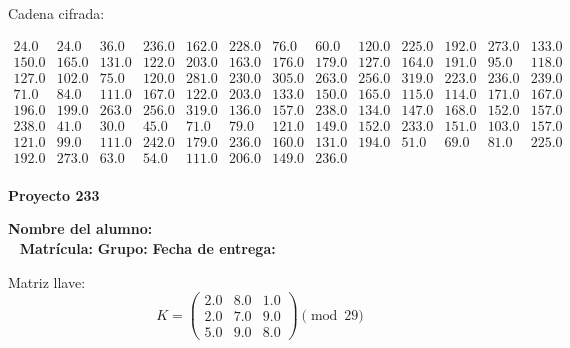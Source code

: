 \documentclass[12pt]{article}
\begin{document}
Cadena cifrada:
\begin{center}
$\begin{array}{lllllllllllll}
24.0 & 24.0 & 36.0 & 236.0 & 162.0 & 228.0 & 76.0 & 60.0 & 120.0 & 225.0 & 192.0 & 273.0 & 133.0\\
150.0 & 165.0 & 131.0 & 122.0 & 203.0 & 163.0 & 176.0 & 179.0 & 127.0 & 164.0 & 191.0 & 95.0 & 118.0\\
127.0 & 102.0 & 75.0 & 120.0 & 281.0 & 230.0 & 305.0 & 263.0 & 256.0 & 319.0 & 223.0 & 236.0 & 239.0\\
71.0 & 84.0 & 111.0 & 167.0 & 122.0 & 203.0 & 133.0 & 150.0 & 165.0 & 115.0 & 114.0 & 171.0 & 167.0\\
196.0 & 199.0 & 263.0 & 256.0 & 319.0 & 136.0 & 157.0 & 238.0 & 134.0 & 147.0 & 168.0 & 152.0 & 157.0\\
238.0 & 41.0 & 30.0 & 45.0 & 71.0 & 79.0 & 121.0 & 149.0 & 152.0 & 233.0 & 151.0 & 103.0 & 157.0\\
121.0 & 99.0 & 111.0 & 242.0 & 179.0 & 236.0 & 160.0 & 131.0 & 194.0 & 51.0 & 69.0 & 81.0 & 225.0\\
192.0 & 273.0 & 63.0 & 54.0 & 111.0 & 206.0 & 149.0 & 236.0\\
\end{array}$
\end{center}

\newpage


\textbf{Proyecto 233}

\textbf{Nombre del alumno:} \underline{\hspace{13cm}}\\\
\vspace{1cm}
\textbf{Matrícula:} \underline{\hspace{4cm}} \hspace{1cm}
\textbf{Grupo:} \underline{\hspace{2cm}}
\textbf{Fecha de entrega:} \underline{\hspace{2cm}}

\medskip

Matriz llave:
\[
K = \begin{pmatrix}
2.0 & 8.0 & 1.0\\
2.0 & 7.0 & 9.0\\
5.0 & 9.0 & 8.0
\end{pmatrix} \pmod{29}
\]
\end{document}
